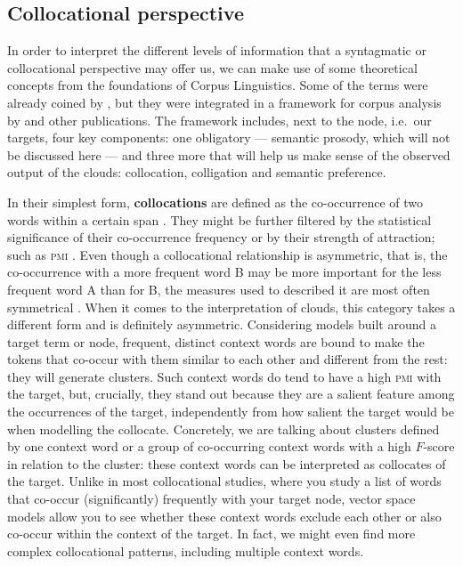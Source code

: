 \documentclass[
]{book}
\begin{document}
\hypertarget{collocationally}{%
\subsection{Collocational perspective}\label{collocationally}}

In order to interpret the different levels of information that a syntagmatic or collocational perspective may offer us, we can make use of some theoretical concepts from the foundations of Corpus Linguistics. Some of the terms were already coined by \textcite{firth_1957a}, but they were integrated in a framework for corpus analysis by \textcite[124-125]{sinclair_1998} and other publications. The framework includes, next to the node, i.e.~our targets, four key components: one obligatory --- semantic prosody, which will not be discussed here --- and three more that will help us make sense of the observed output of the clouds: collocation, colligation and semantic preference.

In their simplest form, \textbf{collocations} are defined as the co-occurrence of two words within a certain span \autocites[13]{firth_1957a}[170]{sinclair_1991}[15]{sinclair_1998}[124]{stubbs_2009}. They might be further filtered by the statistical significance of their co-occurrence frequency or by their strength of attraction; such as \textsc{pmi} \autocite[see][122-133 for a discussion]{mcenery.hardie_2012}. Even though a collocational relationship is asymmetric, that is, the co-occurrence with a more frequent word B may be more important for the less frequent word A than for B, the measures used to described it are most often symmetrical \autocite{gries_2013}.
When it comes to the interpretation of clouds, this category takes a different form and is definitely asymmetric. Considering models built around a target term or node, frequent, distinct context words are bound to make the tokens that co-occur with them similar to each other and different from the rest: they will generate clusters. Such context words do tend to have a high \textsc{pmi} with the target, but, crucially, they stand out because they are a salient feature among the occurrences of the target, independently from how salient the target would be when modelling the collocate.
Concretely, we are talking about clusters defined by one context word or a group of co-occurring context words with a high \(F\)-score in relation to the cluster: these context words can be interpreted as collocates of the target.
Unlike in most collocational studies, where you study a list of words that co-occur (significantly) frequently with your target node, vector space models allow you to see whether these context words exclude each other or also co-occur within the context of the target. In fact, we might even find more complex collocational patterns, including multiple context words.
\end{document}
